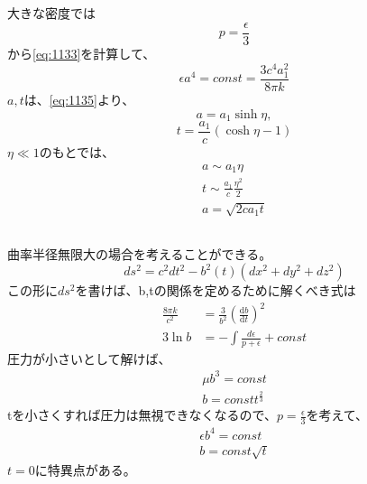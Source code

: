 \documentclass{jsarticle}
\newcommand{\dder}[2][]{\frac{\mathrm{d}#1}{\mathrm{d}#2}}
\newcommand{\beq}{\begin{equation}}
\newcommand{\eeq}{\end{equation}}
\begin{document}
\subsection{}
大きな密度では
\beq
    p = \frac{\epsilon}{3}
\eeq
から\eqref{eq:1133}を計算して、
\beq
    \epsilon a^4 = const = \frac{3c^4a_1^2}{8\pi k}
\eeq
$a,t$は、\eqref{eq:1135}より、
\beq
    a = a_1 \sinh\eta ,\eeq
\beq
t = \frac{a_1}{c}(\cosh\eta - 1)
\eeq
$\eta \ll 1$のもとでは、
\begin{align}
    a \sim a_1 \eta\\
    t \sim \frac{a_1}{c}\frac{\eta^2}{2}\\
    a = \sqrt{2ca_1t}
\end{align}
\subsection{}
曲率半径無限大の場合を考えることができる。
\beq
    ds^2 = c^2 dt^2 - b^2(t)(dx^2 + dy^2 + dz^2)
\eeq
この形に$ds^2$を書けば、b,tの関係を定めるために解くべき式は
\begin{align}
    \frac{8\pi k}{c^2} &= \frac{3}{b^2}(\dder[b]{t})^2\\
    3\ln b &= - \int \frac{d\epsilon}{p + \epsilon} + const
\end{align}
圧力が小さいとして解けば、
\begin{align}
    \mu b^3 = const\\
    b = const t^{\frac{2}{3}}
\end{align}
tを小さくすれば圧力は無視できなくなるので、$p = \frac{\epsilon}{3}$を考えて、
\begin{align}
    \epsilon b^4 = const\\
    b = const \sqrt{t}
\end{align}
$t=0$に特異点がある。
\end{document}
